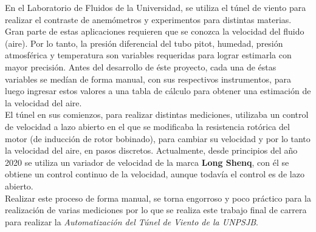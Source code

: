 En el Laboratorio de Fluidos de la Universidad, se utiliza el túnel de viento para realizar el contraste de anemómetros y experimentos para distintas materias. Gran parte de estas aplicaciones requieren que se conozca la velocidad del fluido (aire). Por lo tanto, la presión diferencial del tubo pitot, humedad, presión atmosférica y temperatura son variables requeridas para lograr estimarla con mayor precisión.
Antes del desarrollo de éste proyecto, cada una de éstas variables se medían de forma manual, con sus respectivos instrumentos, para luego ingresar estos valores a una tabla de cálculo para obtener una estimación de la velocidad del aire.\\

El túnel en sus comienzos, para realizar distintas mediciones, utilizaba un control de velocidad a lazo abierto en el que se modificaba la resistencia rotórica del motor (de inducción de rotor bobinado), para cambiar su velocidad y por lo tanto la velocidad del aire, en pasos discretos.
Actualmente, desde principios del año 2020 se utiliza un variador de velocidad de la marca \textbf{Long Shenq}, con él se obtiene un control continuo de la velocidad, aunque todavía el control es de lazo abierto. \\

Realizar este proceso de forma manual, se torna engorroso y poco práctico para la realización de varias mediciones por lo que se realiza este trabajo final de carrera para realizar la \textit{Automatización del Túnel de Viento de la UNPSJB}.

\newpage